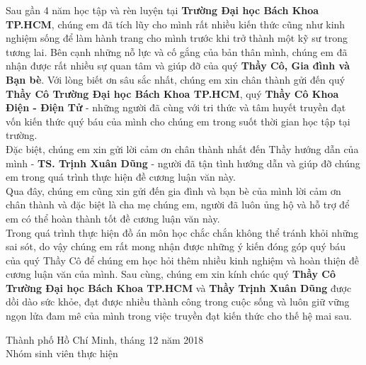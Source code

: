 \cleardoublepage
{}

\begin{acknowledgements}

Sau gần 4 năm học tập và rèn luyện tại\textbf{ Trường Đại học Bách Khoa TP.HCM},
chúng em đã tích lũy cho mình rất nhiều kiến thức cũng như kinh nghiệm sống để làm
hành trang cho mình trước khi trở thành một kỹ sư trong tương lai. Bên cạnh
những nỗ lực và cố gắng của bản thân mình, chúng em đã nhận được rất nhiều sự quan
tâm và giúp đỡ của quý \textbf{Thầy Cô, Gia đình và Bạn bè}. Với lòng biết ơn sâu sắc
nhất, chúng em xin chân thành gửi đến quý \textbf{Thầy Cô Trường Đại học Bách Khoa
TP.HCM}, quý \textbf{Thầy Cô Khoa Điện - Điện Tử} - những người đã cùng với tri
thức và tâm huyết truyền đạt vốn kiến thức quý báu của mình cho chúng em trong
suốt thời gian học tập tại trường.\\
Đặc biệt, chúng em xin gửi lời cảm ơn chân thành nhất đến Thầy hướng dẫn của mình -
\textbf{TS. Trịnh Xuân Dũng} - người đã tận tình hướng dẫn và giúp đỡ chúng em trong quá
trình thực hiện đề cương luận văn này.\\
Qua đây, chúng em cũng xin gửi đến gia đình và bạn bè của mình lời cảm ơn chân thành
và đặc biệt là cha mẹ chúng em, người đã luôn ủng hộ và hỗ trợ để em có thể hoàn thành tốt
đề cương luận văn này.\\
Trong quá trình thực hiện đồ án môn học chắc chắn không thể tránh khỏi những sai sót,
do vậy chúng em rất mong nhận được những ý kiến đóng góp quý báu của quý Thầy Cô
để chúng em học hỏi thêm nhiều kinh nghiệm và hoàn thiện đề cương luận văn của mình.
Sau cùng, chúng em xin kính chúc quý \textbf{Thầy Cô Trường Đại học Bách Khoa TP.HCM}
và \textbf{Thầy Trịnh Xuân Dũng} được dồi dào sức khỏe, đạt được nhiều thành công
trong cuộc sống và luôn giữ vững ngọn lửa đam mê của mình trong việc truyền đạt
kiến thức cho thế hệ mai sau.
\\
\begin{flushright}
Thành phố Hồ Chí Minh, tháng 12 năm 2018\\
Nhóm sinh viên thực hiện
\end{flushright}

\end{acknowledgements}
